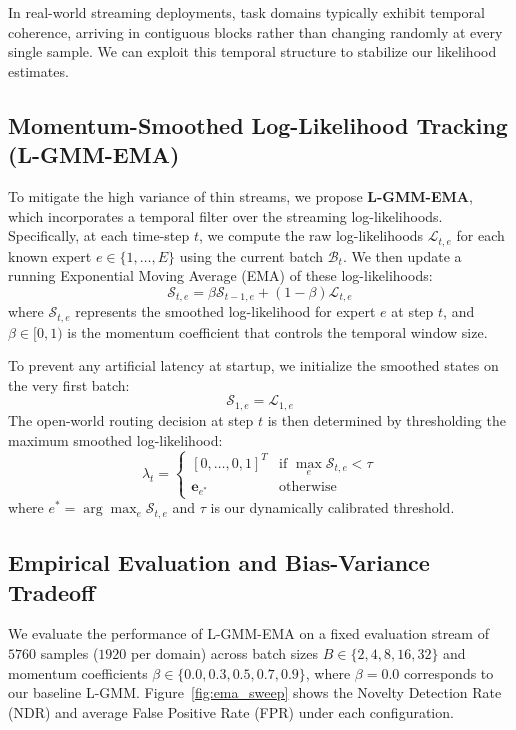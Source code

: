 \documentclass{article}
\theoremstyle{plain}
\theoremstyle{definition}
\theoremstyle{remark}
\begin{document}
In real-world streaming deployments, task domains typically exhibit temporal coherence, arriving in contiguous blocks rather than changing randomly at every single sample. We can exploit this temporal structure to stabilize our likelihood estimates.

\subsection{Momentum-Smoothed Log-Likelihood Tracking (L-GMM-EMA)}
To mitigate the high variance of thin streams, we propose \textbf{L-GMM-EMA}, which incorporates a temporal filter over the streaming log-likelihoods. Specifically, at each time-step $t$, we compute the raw log-likelihoods $\mathcal{L}_{t, e}$ for each known expert $e \in \{1, \dots, E\}$ using the current batch $\mathcal{B}_t$. We then update a running Exponential Moving Average (EMA) of these log-likelihoods:
\begin{equation}
\mathcal{S}_{t, e} = \beta \mathcal{S}_{t-1, e} + (1 - \beta) \mathcal{L}_{t, e}
\end{equation}
where $\mathcal{S}_{t, e}$ represents the smoothed log-likelihood for expert $e$ at step $t$, and $\beta \in [0, 1)$ is the momentum coefficient that controls the temporal window size.

To prevent any artificial latency at startup, we initialize the smoothed states on the very first batch:
\begin{equation}
\mathcal{S}_{1, e} = \mathcal{L}_{1, e}
\end{equation}
The open-world routing decision at step $t$ is then determined by thresholding the maximum smoothed log-likelihood:
\begin{equation}
\lambda_t = \begin{cases}
[0, \dots, 0, 1]^T & \text{if } \max_e \mathcal{S}_{t, e} < \tau \\
\mathbf{e}_{e^*} & \text{otherwise}
\end{cases}
\end{equation}
where $e^* = \arg\max_e \mathcal{S}_{t, e}$ and $\tau$ is our dynamically calibrated threshold.

\subsection{Empirical Evaluation and Bias-Variance Tradeoff}
We evaluate the performance of L-GMM-EMA on a fixed evaluation stream of $5760$ samples ($1920$ per domain) across batch sizes $B \in \{2, 4, 8, 16, 32\}$ and momentum coefficients $\beta \in \{0.0, 0.3, 0.5, 0.7, 0.9\}$, where $\beta = 0.0$ corresponds to our baseline L-GMM. Figure~\ref{fig:ema_sweep} shows the Novelty Detection Rate (NDR) and average False Positive Rate (FPR) under each configuration.
\end{document}
